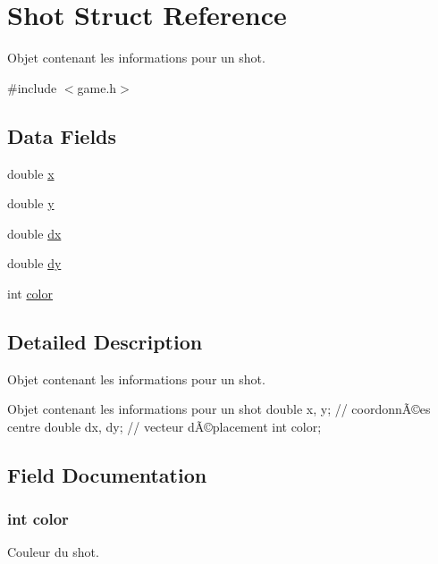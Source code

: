 \hypertarget{struct_shot}{}\section{Shot Struct Reference}
\label{struct_shot}


Objet contenant les informations pour un shot.  




{\ttfamily \#include $<$game.\+h$>$}

\subsection*{Data Fields}
\begin{DoxyCompactItemize}
\item 
double \hyperlink{struct_shot_af88b946fb90d5f08b5fb740c70e98c10}{x}
\item 
double \hyperlink{struct_shot_ab927965981178aa1fba979a37168db2a}{y}
\item 
double \hyperlink{struct_shot_a229d11aff11a7482259d1296b9b70b8a}{dx}
\item 
double \hyperlink{struct_shot_a9deb6f886b19d50e714d890c3c268efc}{dy}
\item 
int \hyperlink{struct_shot_a0fd02fb9277ffcb35a75066ffe95e8c7}{color}
\end{DoxyCompactItemize}


\subsection{Detailed Description}
Objet contenant les informations pour un shot. 

Objet contenant les informations pour un shot double x, y; // coordonnÃ©es centre double dx, dy; // vecteur dÃ©placement int color; 

\subsection{Field Documentation}
\subsubsection[{\texorpdfstring{color}{color}}]{\setlength{\rightskip}{0pt plus 5cm}int color}\hypertarget{struct_shot_a0fd02fb9277ffcb35a75066ffe95e8c7}{}\label{struct_shot_a0fd02fb9277ffcb35a75066ffe95e8c7}
Couleur du shot. 
